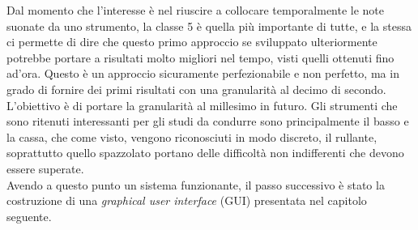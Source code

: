 Dal momento che l'interesse è nel riuscire a collocare temporalmente le note suonate da uno strumento, la classe 5 è quella più importante di tutte, e la stessa ci permette di dire che questo primo approccio se sviluppato ulteriormente potrebbe portare a risultati molto migliori nel tempo, visti quelli ottenuti fino ad'ora. Questo è un approccio sicuramente perfezionabile e non perfetto, ma in grado di fornire dei primi risultati con una granularità al decimo di secondo. L'obiettivo è di portare la granularità al millesimo in futuro. Gli strumenti che sono ritenuti interessanti per gli studi da condurre sono principalmente il basso e la cassa, che come visto, vengono riconosciuti in modo discreto, il rullante, soprattutto quello spazzolato portano delle difficoltà non indifferenti che devono essere superate.\\
Avendo a questo punto un sistema funzionante, il passo successivo è stato la costruzione di una \emph{graphical user interface} (GUI) presentata nel capitolo seguente.

